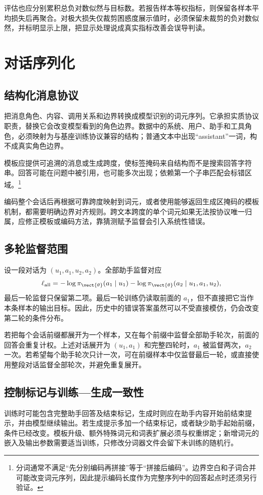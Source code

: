 \documentclass[../textbook.tex]{subfiles}
\begin{document}
评估也应分别累积总负对数似然与目标数。若报告样本等权指标，则保留各样本平均损失后再聚合。对极大损失仅裁剪困惑度展示值时，必须保留未裁剪的负对数似然，并标明显示上限，把显示处理说成真实指标改善会误导判读。

\section{对话序列化}

\subsection{结构化消息协议}
把消息角色、内容、调用关系和边界转换成模型识别的词元序列。它承担实质协议职责，替换它会改变模型看到的角色边界。数据中的系统、用户、助手和工具角色，必须映射为与基座训练协议兼容的结构；普通文本中出现“assistant”一词，构不成真实角色边界。

模板应提供可追溯的消息或生成跨度，使标签掩码来自结构而不是搜索回答字符串。回答可能在问题中被引用，也可能多次出现；依赖第一个子串匹配会标错区域。\footnote{分词通常不满足“先分别编码再拼接”等于“拼接后编码”。边界空白和子词合并可能改变词元序列，因此提示编码长度作为完整序列中的回答起点时还须另行验证。}

编码整个会话后再根据可靠跨度映射到词元，或者使用能够返回生成区掩码的模板机制，都需要明确边界对齐规则。跨文本跨度的单个词元如果无法按协议唯一归属，应修正模板或编码方法，靠猜测赋予监督会引入系统性错误。

\subsection{多轮监督范围}
设一段对话为 $(u_1,a_1,u_2,a_2)$。全部助手监督对应
\begin{equation}
 \ell_{\mathrm{all}}=-\log\pi_{\vect{\theta}}(a_1\mid u_1)
 -\log\pi_{\vect{\theta}}(a_2\mid u_1,a_1,u_2),
\end{equation}
最后一轮监督只保留第二项。最后一轮训练仍读取前面的 $a_1$，但不直接把它当作本条样本的输出目标。因此，历史中的错误答案虽然可以不受直接模仿，仍会改变第二轮的条件分布。

若把每个会话前缀都展开为一个样本，又在每个前缀中监督全部助手轮次，前面的回答会重复计权。上述对话展开为 $(u_1,a_1)$ 和完整四轮时，$a_1$ 被监督两次，$a_2$ 一次。若希望每个助手轮次只计一次，可在前缀样本中仅监督最后一轮，或直接使用整段对话监督全部轮次，并避免重复展开。

\subsection{控制标记与训练—生成一致性}
训练时可能包含完整助手回答及结束标记，生成时则应在助手内容开始前结束提示，并由模型继续输出。若生成提示多加一个结束标记，或者缺少助手起始前缀，条件已经改变。模板升级、额外特殊词元和词表扩展必须与权重绑定；新增词元的嵌入及输出参数需要适当训练，只修改分词器文件会留下未训练的随机行。
\end{document}
